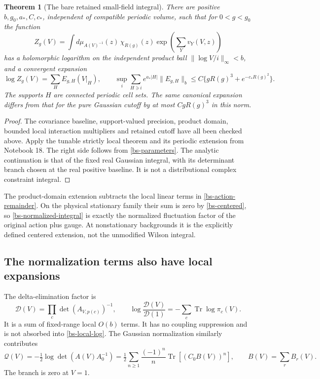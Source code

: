 \documentclass[11pt]{article}
\newtheorem{theorem}{Theorem}[section]
\theoremstyle{remark}
\begin{document}
\begin{theorem}[The bare retained small-field integral]
\label{bs-theorem}
There are positive $b,g_0,a_*,C,c_*$, independent of compatible
periodic volume, such that for $0<g<g_0$ the function
\begin{equation}\label{bs-normalized-integral}
 Z_g(V)=\int d\mu_{A(V)^{-1}}(z)\,
                  \chi_{R(g)}(z)\exp\!\left(\sum_Y v_Y(V,z)\right)
\end{equation}
has a holomorphic logarithm on the independent product ball
$\|\log V/i\|_\infty<b$, and a convergent expansion
\begin{equation}\label{bs-local-log}
 \log Z_g(V)=\sum_H E_{g,H}(V|_H),\qquad
 \sup_i\sum_{H\ni i}e^{a_*|H|}\|E_{g,H}\|_b
 \le C\{gR(g)^3+e^{-c_*R(g)^2}\}.
\end{equation}
The supports $H$ are connected periodic cell sets. The same
canonical expansion differs from that for the pure Gaussian
cutoff by at most $CgR(g)^3$ in this norm.
\end{theorem}
\begin{proof}
The covariance baseline, support-valued precision, product
domain, bounded local interaction multipliers and retained
cutoff have all been checked above. Apply the tunable strictly
local theorem and its periodic extension from Notebook 18.
The right side follows from \eqref{bs-parameters}. The
analytic continuation is that of the fixed real Gaussian
integral, with its determinant branch chosen at the real
positive baseline. It is not a distributional complex
constraint integral.
\end{proof}

The product-domain extension subtracts the local linear
terms in \eqref{bs-action-remainder}. On the physical
stationary family their sum is zero by \eqref{bs-centered},
so \eqref{bs-normalized-integral} is exactly the normalized
fluctuation factor of the original action plus gauge.
At nonstationary backgrounds it is the explicitly defined
centered extension, not the unmodified Wilson integral.

\subsection{The normalization terms also have local expansions}

The delta-elimination factor is
\begin{equation}\label{bs-delta-factor}
 \mathcal D(V)=\prod_c\det(A_{V,p(c)})^{-1},\qquad
 \log\frac{\mathcal D(V)}{\mathcal D(1)}
         =-\sum_c\operatorname{Tr}\log\pi_c(V).
\end{equation}
It is a sum of fixed-range local $O(b)$ terms. It has no
coupling suppression and is not absorbed into
\eqref{bs-local-log}. The Gaussian normalization similarly
contributes
\begin{equation}\label{bs-gaussian-det}
 \mathcal Q(V)=-\tfrac12\log\det(A(V)A_0^{-1})
 =\tfrac12\sum_{n\ge1}\frac{(-1)^n}{n}
                 \operatorname{Tr}[(C_0 B(V))^n],
 \qquad B(V)=\sum_r B_r(V).
\end{equation}
The branch is zero at $V=1$.
\end{document}
